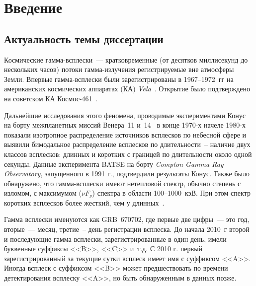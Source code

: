 \chapter{Введение}					
	
\section{Актуальность темы диссертации}

Космические гамма-всплески~--- кратковременные (от десятков миллисекунд до нескольких часов) 
потоки гамма-излучения регистрируемые вне атмосферы Земли. Впервые гамма-всплески 
были зарегистрированы в 1967--1972~гг на американских космических аппаратах (КА) 
\textit{Vela}~\citep{Klebesadel_1973ApJ}. Открытие было подтверждено на советском
КА Космос-461~\citep{Mazets_1974PZETF_ru}. 

Дальнейшие исследования этого феномена, проводимые экспериментами Конус на борту 
межпланетных миссий Венера~11 и~14~\citep{Mazets_1981_part_1} в конце 1970-х начеле 1980-х показали изотропное
распределение источников всплесков по небесной сфере и выявили бимодальное распределение
всплесков по длительности~-- наличие двух классов всплесков: длинных и коротких
с границей по длительности около одной секунды.
Данные эксперимента BATSE на борту \textit{Compton Gamma Ray Observatory}, запущенного 
в 1991 г., подтвердили результаты Конус. Также было обнаружено, что 
гамма-всплески имеют нетепловой спектр, обычно степень с изломом, с максимумом
($\nu F_{\nu}$) спектра в области 100--1000~кэВ. При этом спектр 
коротких всплесков более жесткий, чем у длинных~\citep{Kouveliotou_1993}. 

Гамма всплески именуются как GRB~670702,
где первые две цифры~--- это год, вторые~--- месяц, третие~-- день регистрации всплеска.
До начала 2010~г второй и последующие гамма всплески, зарегистрированные в один день, имели 
буквенные суффиксы <<B>>, <<C>> и~т.д. С 2010 г. первый зарегистрированный за текущие сутки 
всплеск имеет имя с суффиксом <<A>>. Иногда всплеск с суффиксом <<B>> может предшествовать
по времени детектирования всплеску <<A>>, но быть обнаруженным в данных позже.

